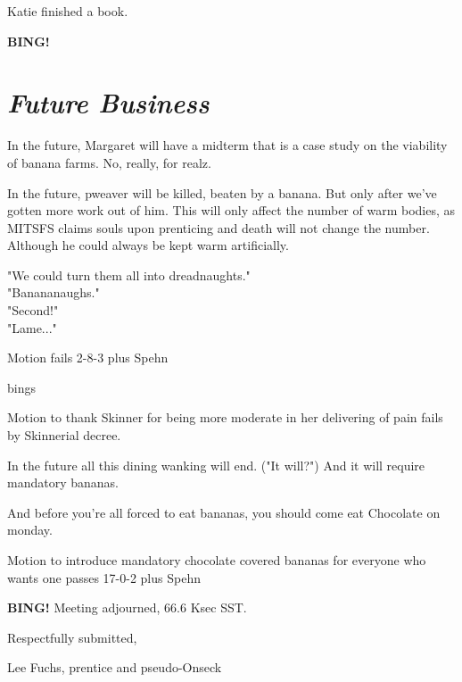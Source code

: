 \documentclass[10pt]{article}
\newcommand{\bing}{{\bf BING!} }
\newcommand{\goto}[1]{\bing \vskip 12pt \section*{{\em{#1}}}}
\newcommand{\ps}{ plus Spehn\xspace}
\begin{document}
Katie finished a book.

\goto{Future Business}

In the future, Margaret will have a midterm that is a case study on the viability
of banana farms. No, really, for realz.

In the future, pweaver will be killed, beaten by a banana. But only after we've gotten
more work out of him. This will only affect the number of warm bodies, as MITSFS claims
souls upon prenticing and death will not change the number. Although he could always
be kept warm artificially. 

"We could turn them all into dreadnaughts."\\
"Banananaughs."\\
"Second!"\\
"Lame..."

Motion fails 2-8-3\ps

bings

Motion to thank Skinner for being more moderate in her delivering of pain fails by
Skinnerial decree.

In the future all this dining wanking will end. ("It will?") And it will require
mandatory bananas.

And before you're all forced to eat bananas, you should come eat Chocolate on monday.

Motion to introduce mandatory chocolate covered bananas for everyone who wants one
passes 17-0-2\ps

\bing
\noindent
Meeting adjourned, 66.6 Ksec SST.

\vspace{18pt}

\centerline{Respectfully submitted,}
\centerline{Lee Fuchs, prentice and pseudo-Onseck}
\end{document}
